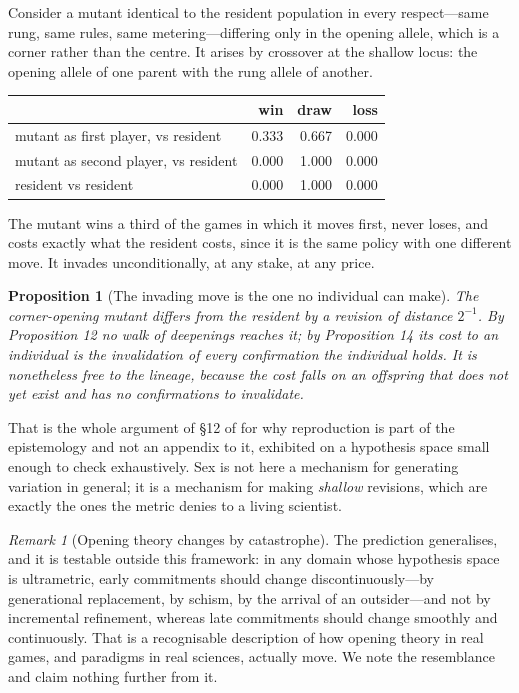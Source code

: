 \documentclass[11pt]{article}
\theoremstyle{definition}
\theoremstyle{plain}
\newtheorem{proposition}[definition]{Proposition}
\theoremstyle{remark}
\newtheorem{remark}[definition]{Remark}
\begin{document}
Consider a mutant identical to the resident population in every respect---same
rung, same rules, same metering---differing only in the opening allele, which is
a corner rather than the centre. It arises by crossover at the shallow locus: the
opening allele of one parent with the rung allele of another.

\begin{center}
\begin{tabular}{@{}lrrr@{}}
\toprule
 & win & draw & loss \\
\midrule
mutant as first player, vs resident & 0.333 & 0.667 & 0.000 \\
mutant as second player, vs resident & 0.000 & 1.000 & 0.000 \\
resident vs resident & 0.000 & 1.000 & 0.000 \\
\bottomrule
\end{tabular}
\end{center}

The mutant wins a third of the games in which it moves first, never loses, and
costs exactly what the resident costs, since it is the same policy with one
different move. It invades unconditionally, at any stake, at any price.

\begin{proposition}[The invading move is the one no individual can make]
The corner-opening mutant differs from the resident by a revision of distance
$2^{-1}$. By Proposition 12 no walk of deepenings reaches it; by Proposition 14
its cost to an individual is the invalidation of every confirmation the
individual holds. It is nonetheless free to the lineage, because the cost falls
on an offspring that does not yet exist and has no confirmations to invalidate.
\end{proposition}

That is the whole argument of \S12 of \cite{scientist} for why reproduction is
part of the epistemology and not an appendix to it, exhibited on a hypothesis
space small enough to check exhaustively. Sex is not here a mechanism for
generating variation in general; it is a mechanism for making \emph{shallow}
revisions, which are exactly the ones the metric denies to a living scientist.

\begin{remark}[Opening theory changes by catastrophe]
The prediction generalises, and it is testable outside this framework: in any
domain whose hypothesis space is ultrametric, early commitments should change
discontinuously---by generational replacement, by schism, by the arrival of an
outsider---and not by incremental refinement, whereas late commitments should
change smoothly and continuously. That is a recognisable description of how
opening theory in real games, and paradigms in real sciences, actually move. We
note the resemblance and claim nothing further from it.
\end{remark}
\end{document}
